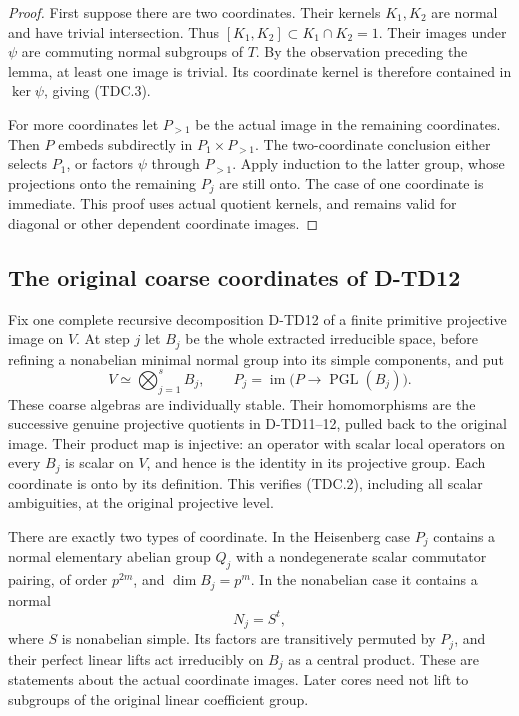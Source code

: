 \begin{proof}
First suppose there are two coordinates. Their kernels $K_1,K_2$
are normal and have trivial intersection. Thus
$[K_1,K_2]\subset K_1\cap K_2=1$. Their images under $\psi$
are commuting normal subgroups of $T$. By the observation preceding
the lemma, at least one image is trivial. Its coordinate kernel
is therefore contained in $\ker\psi$, giving (TDC.3).

For more coordinates let $P_{>1}$ be the actual image in the
remaining coordinates. Then $P$ embeds subdirectly in
$P_1\times P_{>1}$. The two-coordinate conclusion either selects
$P_1$, or factors $\psi$ through $P_{>1}$. Apply induction to
the latter group, whose projections onto the remaining $P_j$
are still onto. The case of one coordinate is immediate.
This proof uses actual quotient kernels, and remains valid for
diagonal or other dependent coordinate images.
\end{proof}

\subsection*{The original coarse coordinates of D-TD12}

Fix one complete recursive decomposition D-TD12 of a finite primitive
projective image on $V$. At step $j$ let $B_j$ be the whole extracted
irreducible space, before refining a nonabelian minimal normal group
into its simple components, and put
\[
 V\simeq\bigotimes_{j=1}^s B_j,
 \qquad P_j=\operatorname{im}
       \bigl(P\longrightarrow\operatorname{PGL}(B_j)\bigr).
 \tag{TDC.4}
\]
These coarse algebras are individually stable. Their homomorphisms
are the successive genuine projective quotients in D-TD11--12,
pulled back to the original image. Their product map is injective:
an operator with scalar local operators on every $B_j$ is scalar
on $V$, and hence is the identity in its projective group.
Each coordinate is onto by its definition. This verifies (TDC.2),
including all scalar ambiguities, at the original projective level.

There are exactly two types of coordinate. In the Heisenberg case
$P_j$ contains a normal elementary abelian group $Q_j$ with a
nondegenerate scalar commutator pairing, of order $p^{2m}$, and
$\dim B_j=p^m$. In the nonabelian case it contains a normal
\[
                  N_j=S^t,
 \tag{TDC.5}
\]
where $S$ is nonabelian simple. Its factors are transitively permuted
by $P_j$, and their perfect linear lifts act irreducibly on $B_j$
as a central product. These are statements about the actual
coordinate images. Later cores need not lift to subgroups of the
original linear coefficient group.

